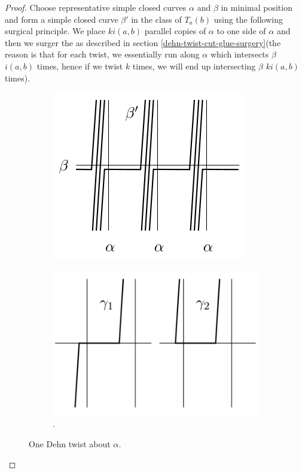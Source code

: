 \documentclass[reqno]{amsart}
\theoremstyle{definition}
\theoremstyle{remark}
\begin{document}
\begin{proof}
    Choose representative simple closed curves
    $\alpha$ and $\beta$ in minimal position and form
    a simple closed curve $\beta'$ in the class
    of $T_a(b)$ using the following surgical principle.
    We place $k i\left( a,b \right) $ parallel copies of
    $\alpha$ to one side of $\alpha$ and
    then we surger the as described in section
    \ref{dehn-twist-cut-glue-surgery}(the reason is that
    for each twist, we essentially run along $\alpha$ which
    intersects $\beta$ $i(a,b)$ times, hence if we twist
    $k$ times, we will end up intersecting $\beta$ 
    $ k i \left( a,b \right) $ times).


    \begin{figure}[H]
\centering
\begin{subfigure}{.5\textwidth}
  \centering
  \includegraphics[width=.8\linewidth]{prop32.png}
  \caption{}
  \label{fig:sub1}
\end{subfigure}%
\begin{subfigure}{.5\textwidth}
  \centering
  \includegraphics[width=.9\linewidth]{prop32b.png}
  \caption{.}
  \label{fig:sub2}
\end{subfigure}
\label{fig:test}
\caption{One Dehn twist about $\alpha$.}
\end{figure}


\end{proof}
\end{document}

